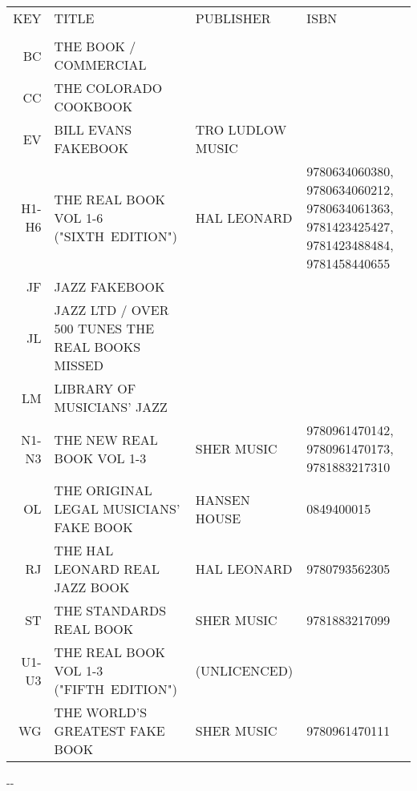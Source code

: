 \documentclass[8pt]{scrartcl}
\begin{document}
\selectfont
\begin{center}
  \begin{tabular}{rp{}p{}p{}}%
    KEY   &  TITLE                                           & PUBLISHER        & ISBN \\
          &                                                  &                  & \\
    BC    &  THE BOOK / COMMERCIAL                           &                  & \\
    CC    &  THE COLORADO COOKBOOK                           &                  & \\
    EV    &  BILL EVANS FAKEBOOK                             & TRO LUDLOW MUSIC & \\
    H1-H6 &  THE REAL BOOK VOL 1-6 ("SIXTH~EDITION")         & HAL LEONARD      & 9780634060380, 9780634060212, 9780634061363, 9781423425427, 9781423488484, 9781458440655 \\
    JF    &  JAZZ FAKEBOOK                                   &                  & \\
    JL    &  JAZZ LTD / OVER 500 TUNES THE REAL BOOKS MISSED &                  & \\
    LM    &  LIBRARY OF MUSICIANS’ JAZZ                      &                  & \\
    N1-N3 &  THE NEW REAL BOOK VOL 1-3                       & SHER MUSIC       & 9780961470142, 9780961470173, 9781883217310 \\
    OL    & THE ORIGINAL LEGAL MUSICIANS' FAKE BOOK          & HANSEN HOUSE     & 0849400015 \\
    RJ    &  THE HAL LEONARD REAL JAZZ BOOK                  & HAL LEONARD      & 9780793562305 \\
    ST    &  THE STANDARDS REAL BOOK                         & SHER MUSIC       & 9781883217099 \\
    U1-U3 &  THE REAL BOOK VOL 1-3 ("FIFTH~EDITION")         & (UNLICENCED)     & \\
    WG    &  THE WORLD'S GREATEST FAKE BOOK                  & SHER MUSIC       & 9780961470111 \\
  \end{tabular}
\end{center}

\begin{multicols}{3}
  \raggedright
  
\end{multicols}

\begin{center}
  \the\year-\the\month-\the\day
\end{center}
\end{document}
